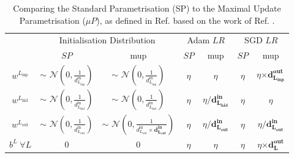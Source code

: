 \begin{table}[h]
  \begin{center}
      \begin{tabular}{c|cc|cc|cc} 
      	 \hline \hline
          & \multicolumn{2}{c|}{Initialisation Distribution} & \multicolumn{2}{c|}{Adam $LR$} & \multicolumn{2}{c}{SGD $LR$}  \\
            & $SP$  & \gls{mup} & $SP$  & \gls{mup} & $SP$  & \gls{mup}  \\ \hline
          $w^{L_\textrm{inp}}$ & $\sim$ $\mathcal{N}\left(0, \frac{1}{d^{\textrm{in}}_{L_\textrm{inp}}}\right)$ & $\sim$ $\mathcal{N}\left(0, \frac{1}{d^{\textrm{in}}_{L_\textrm{inp}}}\right)$                                         & $\eta$ & $\eta$                                    & $\eta$ & $\eta \boldsymbol{\times d^{\textrm{out}}_{L_\textrm{inp}}}$ \\ 
          $w^{L_\textrm{hid}}$ & $\sim$ $\mathcal{N}\left(0, \frac{1}{d^{\textrm{in}}_{L_\textrm{hid}}}\right)$ & $\sim$ $\mathcal{N}\left(0, \frac{1}{d^{\textrm{in}}_{L_\textrm{hid}}}\right)$                                         & $\eta$ & $\eta \boldsymbol{/ d^{\textrm{in}}_{L_\textrm{hid}}}$ & $\eta$ & $\eta$                                    \\ 
          $w^{L_\textrm{out}}$ & $\sim$ $\mathcal{N}\left(0, \frac{1}{d^{\textrm{in}}_{L_\textrm{out}}}\right)$ & $\sim$ $\mathcal{N}\left(0, \frac{1}{d^{\textrm{in}}_{L_\textrm{out}}\times \boldsymbol{d^{\textrm{in}}_{L_\textrm{out}}}}\right)$  & $\eta$ & $\eta \boldsymbol{/ d^{\textrm{in}}_{L_\textrm{out}}}$ & $\eta$ & $\eta \boldsymbol{/ d^{\textrm{in}}_{L_\textrm{out}}}$ \\
          $b^{L} \;\forall L$ & 0 & 0                                                                                                                                                                                          & $\eta$ & $\eta$                                    & $\eta$ & $\eta \boldsymbol{\times d^{\textrm{out}}_{L}}$              \\  \hline \hline
      \end{tabular}
    \caption{Comparing the Standard Parametrisation (SP) to the Maximal Update Parametrisation ($\mu P$), as defined in Ref. \cite{yang2021tuning} based on the work of Ref. \cite{pmlr-v139-yang21c}.}
    \label{tab:mupvsspdef}
  \end{center}
\end{table}

